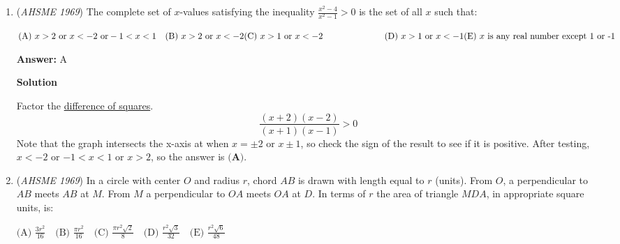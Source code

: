 \begin{enumerate}
 $\text{(A) }\sqrt{a}:\sqrt{b} \quad \text{(B) } \sqrt{a}:\sqrt{a-b}\quad \text{(C) } \sqrt{b}:\sqrt{a-b}\quad \text{(D) } a:\sqrt{a-b}\quad \text{(E) } b:\sqrt{a-b}$

 \textbf{Answer: }B



\textbf{Solution}

The area of the larger circle is $\pi R^2$, and the area of the region outside the smaller circle and inside the larger circle $\pi R^2 - \pi r^2$.  Thus,
 \[\pi R^2 = \frac{a}{b} \cdot (\pi R^2 - \pi r^2)\]
 \[R^2 = \frac{a}{b} \cdot R^2 - \frac{a}{b} \cdot r^2\]
 \[\frac{a}{b} \cdot r^2 = (\frac{a}{b} -1)R^2\]
 \[\frac{a}{b} \div \frac{a-b}{b} = \frac{R^2}{r^2}\]
 \[\frac{a}{a-b} = \frac{R^2}{r^2}\]
 \[\frac{\sqrt{a}}{\sqrt{a-b}} = \frac{R}{r}\]The answer is $\boxed{\textbf{(B)}}$.

 


	\item (\textit{AHSME 1969}) The complete set of $x$-values satisfying the inequality $\frac{x^2-4}{x^2-1}>0$ is the set of all $x$ such that:


 $\text{(A) } x>2 \text{ or } x<-2 \text{ or} -1<x<1\quad  \text{(B) } x>2 \text{ or } x<-2\quad \\ \text{(C) } x>1 \text{ or } x<-2\qquad\qquad\qquad\quad \text{(D) } x>1 \text{ or } x<-1\quad \\ \text{(E) } x \text{ is any real number except 1 or -1}$

 \textbf{Answer: }A



\textbf{Solution}

Factor the \href{https://artofproblemsolving.com/wiki/index.php?title=Difference\_of\_squares}{difference of squares}.
 \[\frac{(x+2)(x-2)}{(x+1)(x-1)}>0\]Note that the graph intersects the x-axis at when $x = \pm2$ or $x \pm 1$, so check the sign of the result to see if it is positive.  After testing, $x<-2$ or $-1<x<1$ or $x>2$, so the answer is $\boxed{\textbf{(A)}}$.

 


	\item (\textit{AHSME 1969}) In a circle with center $O$ and radius $r$, chord $AB$ is drawn with length equal to $r$ (units). From $O$, a perpendicular to $AB$ meets $AB$ at $M$. From $M$ a perpendicular to $OA$ meets $OA$ at $D$. In terms of $r$ the area of triangle $MDA$, in appropriate square units, is:


 $\text{(A) } \frac{3r^2}{16}\quad \text{(B) } \frac{\pi r^2}{16}\quad \text{(C) } \frac{\pi r^2\sqrt{2}}{8}\quad \text{(D) } \frac{r^2\sqrt{3}}{32}\quad \text{(E) } \frac{r^2\sqrt{6}}{48}$


\end{enumerate}
